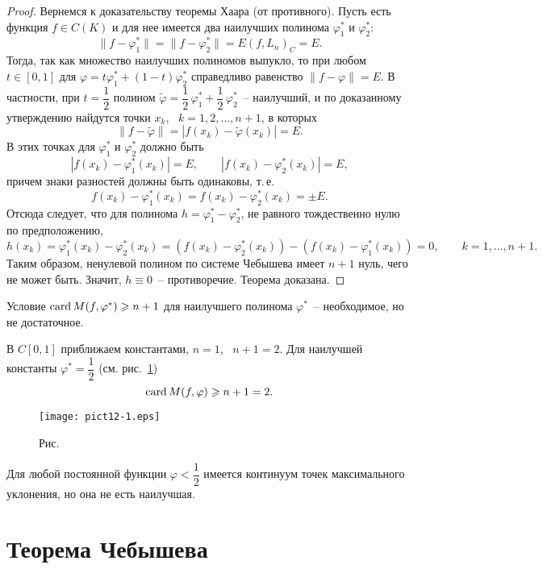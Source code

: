 \begin{proof}
Вернемся к доказательству теоремы Хаара (от противного). Пусть есть функция
$f\in C(K)$ и для нее имеется два наилучших полинома $\varphi_1^*$ и
$\varphi_2^*$:
$$
\|f-\varphi_1^*\|=\|f-\varphi_2^*\|=E(f,{L_n})_C=E.
$$
Тогда, так как множество наилучших полиномов выпукло, то при
любом $t\in[0,1]$ для $\varphi = t\varphi_1^* + (1-t)\varphi_2^*$ справедливо
равенство $\|f-\varphi\|=E$. В частности, при $t=\dfrac12$
полином $\widetilde\varphi = \dfrac12\,\varphi_1^*+\dfrac12\,\varphi_2^*$~--
наилучший, и по доказанному утверждению найдутся точки $x_k$,~ $k=1,2,\ldots,n+1$, в которых
$$
\|f-\widetilde\varphi\|=|f(x_k)-\widetilde\varphi(x_k)|=E.
$$
В этих точках для $\varphi_1^*$ и $\varphi_2^*$ должно быть
$$
|f(x_k)-\varphi_1^*(x_k)|=E,\qquad |f(x_k)-\varphi_2^*(x_k)|=E,
$$
причем знаки разностей должны быть одинаковы, т.\,е.
$$
f(x_k)-\varphi_1^*(x_k) = f(x_k)-\varphi_2^*(x_k) = \pm E.
$$
Отсюда следует, что для полинома $h=\varphi_1^*-\varphi_2^*$, не равного
тождественно нулю по предположению,
$$
h(x_k) = \varphi_1^*(x_k)-\varphi_2^*(x_k) = (f(x_k)-\varphi_2^*(x_k))-
(f(x_k)-\varphi_1^*(x_k)) = 0,\qquad k=1,\ldots,n+1.
$$
Таким образом, ненулевой полином по системе Чебышева имеет $n+1$ нуль,
чего не может быть. Значит, $h\equiv 0$~-- противоречие. Теорема
доказана.
\end{proof}

\begin{Remark}
Условие $\operatorname{card} M(f,\varphi^*)\geqslant n+1$ для наилучшего полинома $\varphi^*$~-- необходимое, но не достаточное.
\end{Remark}

\begin{Example}
В $C[0,1]$ приближаем константами, $n=1$,~ $n+1=2$. Для наилучшей константы
$\varphi^*=\dfrac12$ (см. рис.~\ref{r12-1})
$$
\operatorname{card} M(f,\varphi)\geqslant n+1=2.
$$

 \bigskip
\begin{figure}[ht]
\begin{center}
\texttt{[image: pict12-1.eps]}
\end{center}
 \bigskip
 \label{r12-1}

 \centerline{Рис.~\theris}
 \bigskip
\end{figure}


Для любой постоянной функции $\varphi<\dfrac12$ имеется континуум точек
максимального уклонения, но она не есть наилучшая.
\end{Example}


\section{Теорема Чебышева}

